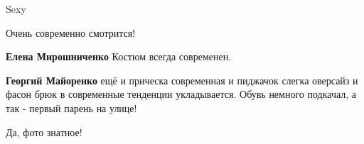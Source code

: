  
 
 
 
 

Sexy

Очень современно смотрится!

\textbf{Елена Мирошниченко} Костюм всегда современен.

\textbf{Георгий Майоренко} ещё и прическа современная и пиджачок слегка оверсайз и фасон брюк в современные тенденции укладывается. Обувь немного подкачал, а так - первый парень на улице!

Да, фото знатное!
